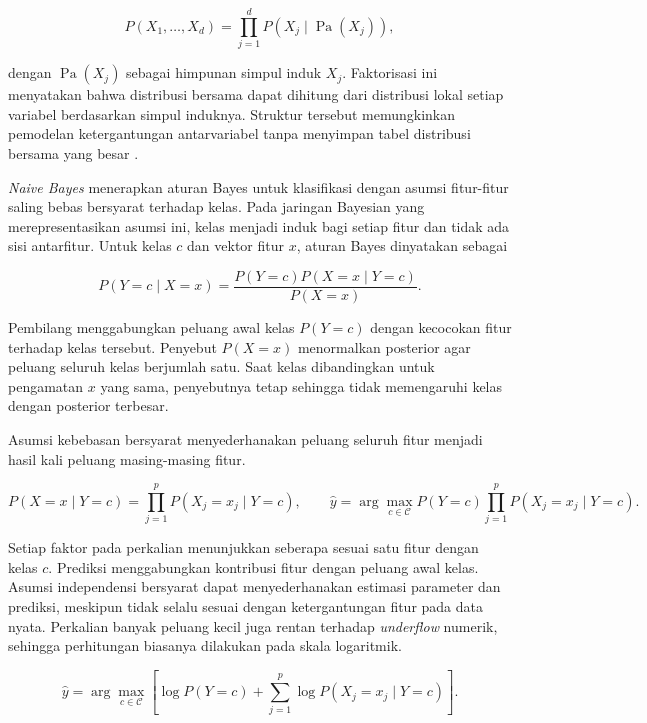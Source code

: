 \begin{equation}
    P(X_1,\ldots,X_d)=\prod_{j=1}^{d}P(X_j\mid\operatorname{Pa}(X_j)),
    \label{eq:bn-factorization}
\end{equation}

dengan $\operatorname{Pa}(X_j)$ sebagai himpunan simpul induk $X_j$. Faktorisasi ini menyatakan bahwa distribusi bersama dapat dihitung dari distribusi lokal setiap variabel berdasarkan simpul induknya. Struktur tersebut memungkinkan pemodelan ketergantungan antarvariabel tanpa menyimpan tabel distribusi bersama yang besar \cite{russell2021artificial}.

\textit{Naive Bayes} menerapkan aturan Bayes untuk klasifikasi dengan asumsi fitur-fitur saling bebas bersyarat terhadap kelas. Pada jaringan Bayesian yang merepresentasikan asumsi ini, kelas menjadi induk bagi setiap fitur dan tidak ada sisi antarfitur. Untuk kelas $c$ dan vektor fitur $x$, aturan Bayes dinyatakan sebagai

\begin{equation}
    P(Y=c\mid X=x)=\frac{P(Y=c)P(X=x\mid Y=c)}{P(X=x)}.
    \label{eq:nb-bayes-rule}
\end{equation}

Pembilang menggabungkan peluang awal kelas $P(Y=c)$ dengan kecocokan fitur terhadap kelas tersebut. Penyebut $P(X=x)$ menormalkan posterior agar peluang seluruh kelas berjumlah satu. Saat kelas dibandingkan untuk pengamatan $x$ yang sama, penyebutnya tetap sehingga tidak memengaruhi kelas dengan posterior terbesar.

Asumsi kebebasan bersyarat menyederhanakan peluang seluruh fitur menjadi hasil kali peluang masing-masing fitur.

\begin{equation}
    P(X=x\mid Y=c)=\prod_{j=1}^{p}P(X_j=x_j\mid Y=c),
    \qquad
    \hat{y}=\arg\max_{c\in\mathcal{C}}P(Y=c)\prod_{j=1}^{p}P(X_j=x_j\mid Y=c).
    \label{eq:nb-independence}
\end{equation}

Setiap faktor pada perkalian menunjukkan seberapa sesuai satu fitur dengan kelas $c$. Prediksi menggabungkan kontribusi fitur dengan peluang awal kelas. Asumsi independensi bersyarat dapat menyederhanakan estimasi parameter dan prediksi, meskipun tidak selalu sesuai dengan ketergantungan fitur pada data nyata. Perkalian banyak peluang kecil juga rentan terhadap \textit{underflow} numerik, sehingga perhitungan biasanya dilakukan pada skala logaritmik.

\begin{equation}
    \hat{y}=\arg\max_{c\in\mathcal{C}}\left[\log P(Y=c)+\sum_{j=1}^{p}\log P(X_j=x_j\mid Y=c)\right].
    \label{eq:nb-log-score}
\end{equation}

